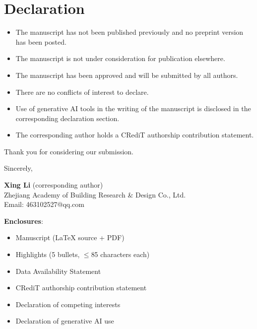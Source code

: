 \documentclass[11pt]{article}
\begin{document}
\section*{Declaration}

\begin{itemize}[leftmargin=*]
    \item The manuscript has not been published previously and no preprint version has been posted.
    \item The manuscript is not under consideration for publication elsewhere.
    \item The manuscript has been approved and will be submitted by all authors.
    \item There are no conflicts of interest to declare.
    \item Use of generative AI tools in the writing of the manuscript is disclosed in the corresponding declaration section.
    \item The corresponding author holds a CRediT authorship contribution statement.
\end{itemize}

\vspace{1.5em}

\noindent Thank you for considering our submission.

\vspace{2em}

\noindent Sincerely,

\vspace{1.5em}

\noindent\textbf{Xing Li} (corresponding author)\\
Zhejiang Academy of Building Research \& Design Co., Ltd.\\
Email: 463102527@qq.com

\vspace{2em}

\noindent\textbf{Enclosures}:
\begin{itemize}[leftmargin=*]
    \item Manuscript (LaTeX source + PDF)
    \item Highlights (5 bullets, $\le$85 characters each)
    \item Data Availability Statement
    \item CRediT authorship contribution statement
    \item Declaration of competing interests
    \item Declaration of generative AI use
\end{itemize}
\end{document}
